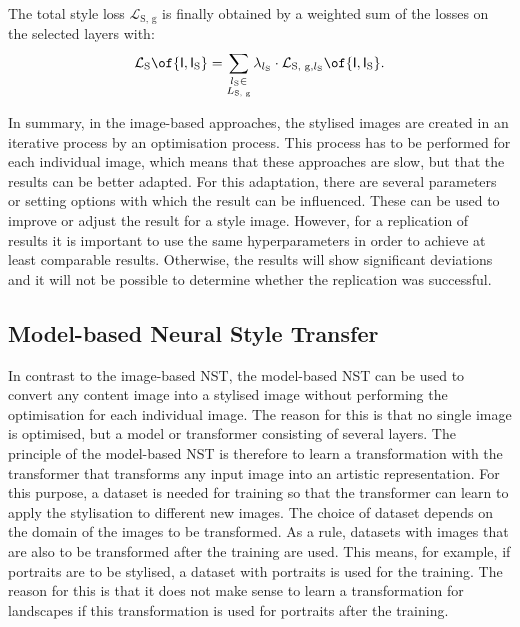 The total style loss $\mathcal{L}_\text{S, g}$ is finally obtained by a weighted sum of the losses on the selected layers with:
\begin{equation*}
	\mathcal{L}_\text{S}\of{\tensor{I}\eqcommasep \tensor{I}_\text{S}} = \sum_{\substack{l_\text{S} \in\\L_\text{S, g}}} \lambda_{l_\text{S}} \cdot \mathcal{L}_{\text{S, g}\eqcommasep l_\text{S}}\of{\tensor{I}\eqcommasep \tensor{I}_\text{S}} \eqtextdot
\end{equation*}

In summary, in the image-based approaches, the stylised images are created in an iterative process by an optimisation process. This process has to be performed for each individual image, which means that these approaches are slow, but that the results can be better adapted. For this adaptation, there are several parameters or setting options with which the result can be influenced. These can be used to improve or adjust the result for a style image. However, for a replication of results it is important to use the same hyperparameters in order to achieve at least comparable results. Otherwise, the results will show significant deviations and it will not be possible to determine whether the replication was successful.

\subsection{Model-based Neural Style Transfer}
In contrast to the image-based \gls{NST}, the model-based \gls{NST} can be used to convert any content image into a stylised image without performing the optimisation for each individual image. The reason for this is that no single image is optimised, but a model or transformer \transformer{} consisting of several layers. The principle of the model-based \gls{NST} is therefore to learn a transformation with the transformer that transforms any input image into an artistic representation. For this purpose, a dataset is needed for training so that the transformer can learn to apply the stylisation to different new images. The choice of dataset depends on the domain of the images to be transformed. As a rule, datasets with images that are also to be transformed after the training are used. This means, for example, if portraits are to be stylised, a dataset with portraits is used for the training. The reason for this is that it does not make sense to learn a transformation for landscapes if this transformation is used for portraits after the training.

